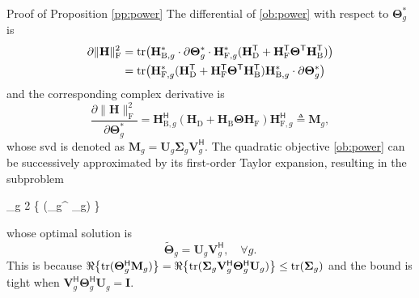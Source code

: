\documentclass[journal]{IEEEtran}
\begin{document}
\begin{appendix}
	\begin{subsection}{Proof of Proposition \ref{pp:power}}
		\label{ap:power}
		The differential of \eqref{ob:power} with respect to $\mathbf{\Theta}_g^*$ is
		\begin{align*}
			\partial \lVert \mathbf{H} \rVert _\mathrm{F}^2
			& = \operatorname{tr}\bigl(\mathbf{H}_{\mathrm{B},g}^* \cdot \partial \mathbf{\Theta}_g^* \cdot \mathbf{H}_{\mathrm{F},g}^* (\mathbf{H}_\mathrm{D}^\mathsf{T} + \mathbf{H}_\mathrm{F}^\mathsf{T} \mathbf{\Theta}^\mathsf{T} \mathbf{H}_\mathrm{B}^\mathsf{T})\bigr) \\
			& = \operatorname{tr}\bigl(\mathbf{H}_{\mathrm{F},g}^* (\mathbf{H}_\mathrm{D}^\mathsf{T} + \mathbf{H}_\mathrm{F}^\mathsf{T} \mathbf{\Theta}^\mathsf{T} \mathbf{H}_\mathrm{B}^\mathsf{T}) \mathbf{H}_{\mathrm{B},g}^* \cdot \partial \mathbf{\Theta}_g^*\bigr)
		\end{align*}
		and the corresponding complex derivative is
		\begin{equation}
			\frac{\partial \lVert \mathbf{H} \rVert _\mathrm{F}^2}{\partial \mathbf{\Theta}_g^*} = \mathbf{H}_{\mathrm{B},g}^\mathsf{H} (\mathbf{H}_\mathrm{D} + \mathbf{H}_\mathrm{B} \mathbf{\Theta} \mathbf{H}_\mathrm{F}) \mathbf{H}_{\mathrm{F},g}^\mathsf{H} \triangleq \mathbf{M}_g,
		\end{equation}
		whose \gls{svd} is denoted as $\mathbf{M}_g = \mathbf{U}_g \mathbf{\Sigma}_g \mathbf{V}_g^\mathsf{H}$.
		The quadratic objective \eqref{ob:power} can be successively approximated by its first-order Taylor expansion, resulting in the subproblem
		\begin{maxi!}
			{\scriptstyle{\mathbf{\Theta}}}{\sum_g 2 \Re\bigl\{ \tr(\mathbf{\Theta}_g^ _g) \bigr\}}{\label{op:power_ris_taylor}}{\label{ob:power_ris_taylor}}
		\end{maxi!}
		whose optimal solution is
		\begin{equation}
			\label{eq:ris_power_taylor}
			\tilde{\mathbf{\Theta}}_g = \mathbf{U}_g \mathbf{V}_g^\mathsf{H}, \quad \forall g.
		\end{equation}
		This is because $\Re \bigl\{\operatorname{tr}(\mathbf{\Theta}_g^\mathsf{H} \mathbf{M}_g)\bigr\} = \Re \bigl\{ \operatorname{tr}(\mathbf{\Sigma}_g \mathbf{V}_g^\mathsf{H} \mathbf{\Theta}_g^\mathsf{H} \mathbf{U}_g) \bigr\} \le \operatorname{tr}(\mathbf{\Sigma}_g)$ and the bound is tight when $\mathbf{V}_g^\mathsf{H} \mathbf{\Theta}_g^\mathsf{H} \mathbf{U}_g = \mathbf{I}$.


\end{subsection}
\end{appendix}
\end{document}
